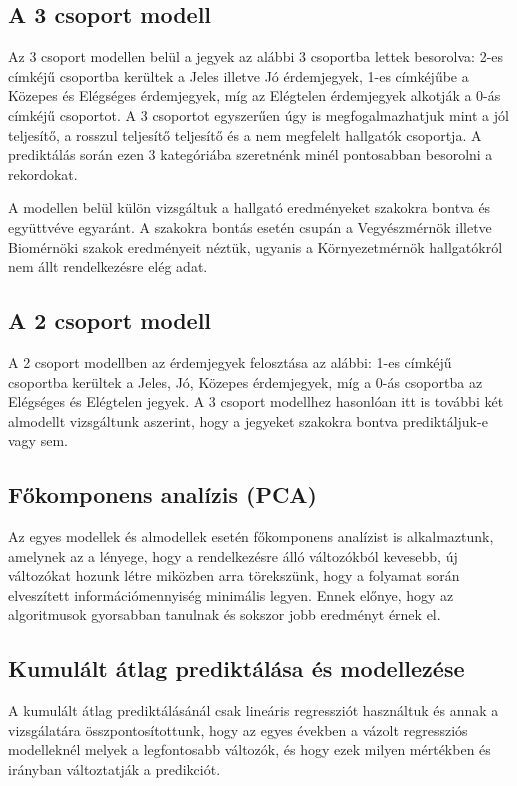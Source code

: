\documentclass[12pt]{article}
\begin{document}
\subsection{A 3 csoport modell}

Az 3 csoport modellen belül a jegyek az alábbi 3 csoportba lettek besorolva: 2-es címkéjű csoportba kerültek a Jeles illetve Jó érdemjegyek, 1-es címkéjűbe a Közepes és Elégséges érdemjegyek, míg az Elégtelen érdemjegyek alkotják a 0-ás címkéjű csoportot. A 3 csoportot egyszerűen úgy is megfogalmazhatjuk mint a jól teljesítő, a rosszul teljesítő teljesítő és a nem megfelelt hallgatók csoportja. A prediktálás során ezen 3 kategóriába szeretnénk minél pontosabban besorolni a rekordokat.

A modellen belül külön vizsgáltuk a hallgató eredményeket szakokra bontva és együttvéve egyaránt. A szakokra bontás esetén csupán a Vegyészmérnök illetve Biomérnöki szakok eredményeit néztük, ugyanis a Környezetmérnök hallgatókról nem állt rendelkezésre elég adat. 

\subsection{A 2 csoport modell}

A 2 csoport modellben az érdemjegyek felosztása az alábbi: 1-es címkéjű csoportba kerültek a Jeles, Jó, Közepes érdemjegyek, míg a 0-ás csoportba az Elégséges és Elégtelen jegyek. A 3 csoport modellhez hasonlóan itt is további két almodellt vizsgáltunk aszerint, hogy a jegyeket szakokra bontva prediktáljuk-e vagy sem. 

\subsection{Főkomponens analízis (PCA)}

Az egyes modellek és almodellek esetén főkomponens analízist is alkalmaztunk, amelynek az a lényege, hogy a rendelkezésre álló változókból kevesebb, új változókat hozunk létre miközben arra törekszünk, hogy a folyamat során elveszített információmennyiség minimális legyen. Ennek előnye, hogy az algoritmusok gyorsabban tanulnak és sokszor jobb eredményt érnek el.

\subsection{Kumulált átlag prediktálása és modellezése}

A kumulált átlag prediktálásánál csak lineáris regressziót használtuk és annak a vizsgálatára összpontosítottunk, hogy az egyes években a vázolt regressziós modelleknél melyek a legfontosabb változók, és hogy ezek milyen mértékben és irányban változtatják a predikciót.
\end{document}
